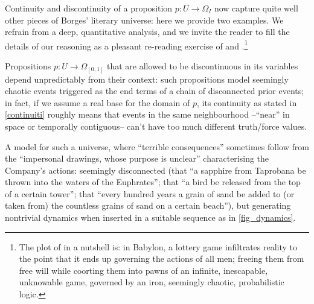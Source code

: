 Continuity and discontinuity of a proposition $p : U \to \Omega_I$ now capture quite well other pieces of Borges' literary universe: here we provide two examples. We refrain from a deep, quantitative analysis, and we invite the reader to fill the details of our reasoning as a pleasant re-reading exercise of \cite{babil} and \cite{tlonEN}.\footnote{The plot of \cite{babil} in a nutshell is: in Babylon, a lottery game infiltrates reality to the point that it ends up governing the actions of all men; freeing them from free will while coorting them into pawns of an infinite, inescapable, unknowable game, governed by an iron, seemingly chaotic, probabilistic logic.}
\begin{example}\label{bli}
	Propositions $p : U \to \Omega_{[0,1]}$ that are allowed to be discontinuous in its variables depend unpredictably from their context: such propositions model seemingly chaotic events triggered as the end terms of a chain of disconnected prior events; in fact, if we assume a real base for the domain of $p$, its continuity as stated in \autoref{continuiti} roughly means that events in the same neighbourhood --``near'' in space or temporally contiguous-- can't have too much different truth/force values.

	A model for such a universe, where ``terrible consequences'' sometimes follow from the ``impersonal drawings, whose purpose is unclear'' characterising the Company's actions: seemingly disconnected (that ``a sapphire from Taprobana be thrown into the waters of the Euphrates''; that ``a bird be released from the top of a certain tower''; that ``every hundred years a grain of sand be added to (or taken from) the countless grains of sand on a certain beach''), but generating nontrivial dynamics when inserted in a suitable sequence as in \autoref{fig_dynamics}.


\end{example}
